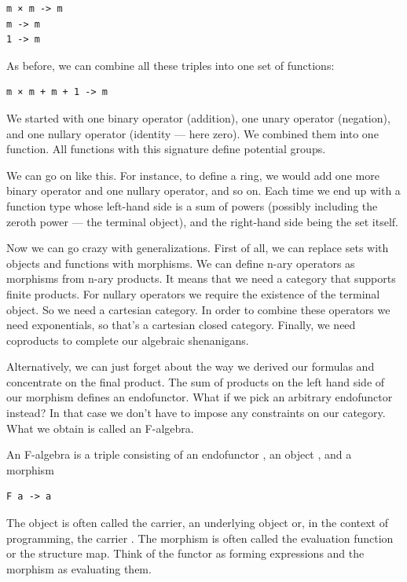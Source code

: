 \begin{Verbatim}[commandchars=\\\{\}]
m × m -> m
m -> m
1 -> m
\end{Verbatim}
As before, we can combine all these triples into one set of functions:

\begin{Verbatim}[commandchars=\\\{\}]
m × m + m + 1 -> m
\end{Verbatim}
We started with one binary operator (addition), one unary operator
(negation), and one nullary operator (identity --- here zero). We
combined them into one function. All functions with this signature
define potential groups.

We can go on like this. For instance, to define a ring, we would add one
more binary operator and one nullary operator, and so on. Each time we
end up with a function type whose left-hand side is a sum of powers
(possibly including the zeroth power --- the terminal object), and the
right-hand side being the set itself.

Now we can go crazy with generalizations. First of all, we can replace
sets with objects and functions with morphisms. We can define n-ary
operators as morphisms from n-ary products. It means that we need a
category that supports finite products. For nullary operators we require
the existence of the terminal object. So we need a cartesian category.
In order to combine these operators we need exponentials, so that's a
cartesian closed category. Finally, we need coproducts to complete our
algebraic shenanigans.

Alternatively, we can just forget about the way we derived our formulas
and concentrate on the final product. The sum of products on the left
hand side of our morphism defines an endofunctor. What if we pick an
arbitrary endofunctor  instead? In that case we don't have to
impose any constraints on our category. What we obtain is called an
F-algebra.

An F-algebra is a triple consisting of an endofunctor , an
object , and a morphism

\begin{Verbatim}[commandchars=\\\{\}]
F a -> a
\end{Verbatim}
The object is often called the carrier, an underlying object or, in the
context of programming, the carrier . The morphism is often
called the evaluation function or the structure map. Think of the
functor  as forming expressions and the morphism as evaluating
them.

